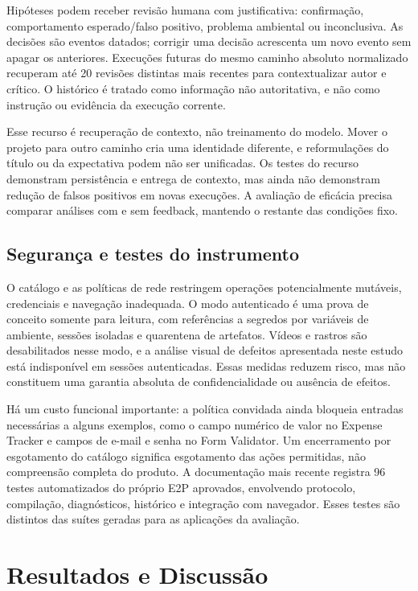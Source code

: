 \documentclass[12pt]{article}
\begin{document}
Hipóteses podem receber revisão humana com justificativa: confirmação, comportamento esperado/falso positivo, problema ambiental ou inconclusiva. As decisões são eventos datados; corrigir uma decisão acrescenta um novo evento sem apagar os anteriores. Execuções futuras do mesmo caminho absoluto normalizado recuperam até 20 revisões distintas mais recentes para contextualizar autor e crítico. O histórico é tratado como informação não autoritativa, e não como instrução ou evidência da execução corrente.

Esse recurso é recuperação de contexto, não treinamento do modelo. Mover o projeto para outro caminho cria uma identidade diferente, e reformulações do título ou da expectativa podem não ser unificadas. Os testes do recurso demonstram persistência e entrega de contexto, mas ainda não demonstram redução de falsos positivos em novas execuções. A avaliação de eficácia precisa comparar análises com e sem feedback, mantendo o restante das condições fixo.

\subsection{Segurança e testes do instrumento}
O catálogo e as políticas de rede restringem operações potencialmente mutáveis, credenciais e navegação inadequada. O modo autenticado é uma prova de conceito somente para leitura, com referências a segredos por variáveis de ambiente, sessões isoladas e quarentena de artefatos. Vídeos e rastros são desabilitados nesse modo, e a análise visual de defeitos apresentada neste estudo está indisponível em sessões autenticadas. Essas medidas reduzem risco, mas não constituem uma garantia absoluta de confidencialidade ou ausência de efeitos.

Há um custo funcional importante: a política convidada ainda bloqueia entradas necessárias a alguns exemplos, como o campo numérico de valor no Expense Tracker e campos de e-mail e senha no Form Validator. Um encerramento por esgotamento do catálogo significa esgotamento das ações permitidas, não compreensão completa do produto. A documentação mais recente registra 96 testes automatizados do próprio E2P aprovados, envolvendo protocolo, compilação, diagnósticos, histórico e integração com navegador. Esses testes são distintos das suítes geradas para as aplicações da avaliação.

\section{Resultados e Discussão}\label{sec:results}
\end{document}
